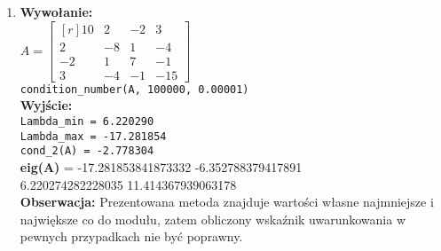 \documentclass[]{article}
\begin{document}
\begin{enumerate}
\item \textbf{Wywołanie:}\\
$A = \begin{bmatrix*}[r]
    10 &    2  &  -2 &    3\\
    2   & -8   &  1  &  -4\\
    -2 &    1&     7  &  -1\\
    3 &   -4  &  -1  & -15
\end{bmatrix*}$\\
\verb|condition_number(A, 100000, 0.00001)|
\\\textbf{Wyjście:}\\
\verb|Lambda_min = 6.220290|\\
\verb|Lambda_max = -17.281854|\\
\verb|cond_2(A) = -2.778304|\\
\textbf{eig(A)} =   -17.281853841873332 -6.352788379417891\\ 6.220274282228035 11.414367939063178\\
\textbf{Obserwacja:} Prezentowana metoda znajduje wartości własne najmniejsze i największe co do modułu, zatem obliczony wskaźnik uwarunkowania w pewnych przypadkach nie być poprawny.
\end{enumerate}
\end{document}
